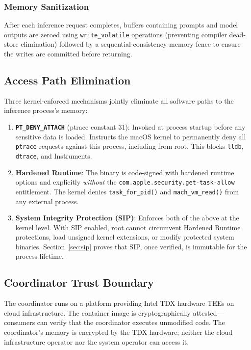 \documentclass[10pt,twocolumn,letterpaper]{article}
\begin{document}
\subsubsection{Memory Sanitization}

After each inference request completes, buffers containing prompts and model outputs are zeroed using \texttt{write\_volatile} operations (preventing compiler dead-store elimination) followed by a sequential-consistency memory fence to ensure the writes are committed before returning.

\subsection{Access Path Elimination}
\label{sec:access-path}

Three kernel-enforced mechanisms jointly eliminate all software paths to the inference process's memory:

\begin{enumerate}[leftmargin=*,itemsep=2pt,topsep=2pt]
    \item \textbf{\texttt{PT\_DENY\_ATTACH}} (ptrace constant 31): Invoked at process startup before any sensitive data is loaded. Instructs the macOS kernel to permanently deny all \texttt{ptrace} requests against this process, including from root. This blocks \texttt{lldb}, \texttt{dtrace}, and Instruments.

    \item \textbf{Hardened Runtime}: The binary is code-signed with hardened runtime options and explicitly \emph{without} the \texttt{com.apple.security.get-task-allow} entitlement. The kernel denies \texttt{task\_for\_pid()} and \texttt{mach\_vm\_read()} from any external process.

    \item \textbf{System Integrity Protection (SIP)}: Enforces both of the above at the kernel level. With SIP enabled, root cannot circumvent Hardened Runtime protections, load unsigned kernel extensions, or modify protected system binaries. Section~\ref{sec:sip} proves that SIP, once verified, is immutable for the process lifetime.
\end{enumerate}

\subsection{Coordinator Trust Boundary}

The coordinator runs on a platform providing Intel TDX hardware TEEs on cloud infrastructure. The container image is cryptographically attested---consumers can verify that the coordinator executes unmodified code. The coordinator's memory is encrypted by the TDX hardware; neither the cloud infrastructure operator nor the system operator can access it.
\end{document}
